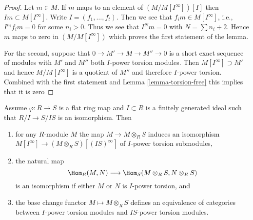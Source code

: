 \begin{proof}
Let $m \in M$. If $m$ maps to an element of $(M/M[I^\infty])[I]$
then $Im \subset M[I^\infty]$.
Write $I = (f_1, \ldots, f_t)$. Then we see that
$f_i m \in M[I^\infty]$, i.e., $I^{n_i}f_i m = 0$ for some $n_i > 0$.
Thus we see that $I^Nm = 0$ with $N = \sum n_i + 2$.
Hence $m$ maps to zero in $(M/M[I^\infty])$ which proves the
first statement of the lemma.

\medskip\noindent
For the second, suppose that $0 \to M' \to M \to M'' \to 0$ is a short
exact sequence of modules with $M'$ and $M''$ both $I$-power torsion
modules. Then $M[I^\infty] \supset M'$ and hence $M/M[I^\infty]$ is a
quotient of $M''$ and therefore $I$-power torsion. Combined with
the first statement and Lemma \ref{lemma-torsion-free} this implies
that it is zero
\end{proof}

\begin{lemma}
\label{lemma-neighbourhood-equivalence}
Assume $\varphi : R \to S$ is a flat ring map and $I \subset R$ is a
finitely generated ideal such that $R/I \to S/IS$ is an isomorphism. Then
\begin{enumerate}
\item for any $R$-module $M$ the map $M \to M \otimes_R S$ induces
an isomorphism
$M[I^\infty] \to (M \otimes_R S)[(IS)^\infty]$ of $I$-power
torsion submodules,
\item the natural map
$$
\Hom_R(M, N) \longrightarrow \Hom_S(M \otimes_R S, N \otimes_R S)
$$
is an isomorphism if either $M$ or $N$ is $I$-power torsion, and
\item the base change functor $M \mapsto M \otimes_R S$ defines an
equivalence of categories between $I$-power torsion modules
and $IS$-power torsion modules.
\end{enumerate}
\end{lemma}

